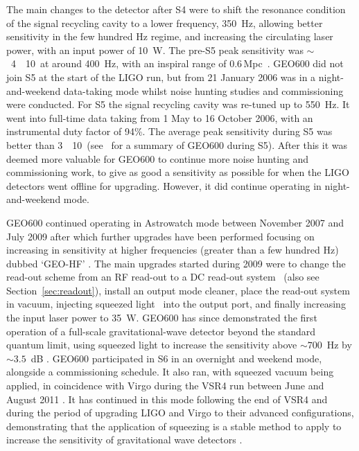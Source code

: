 The main changes to the detector after S4 were to shift the resonance condition of the signal recycling 
cavity to a lower frequency, 350~Hz, allowing better sensitivity in the few hundred Hz regime, and increasing 
the circulating laser power, with an input power of 10~W. The pre-S5 peak sensitivity was
$\sim$~4~\texttimes~10~\Hz at around 400~Hz, with an inspiral range of 0.6\,Mpc~\cite{Hild:2006b}. 
GEO600 did not join S5 at the start of the LIGO run, but from 21 January 2006 was in a night-and-weekend 
data-taking mode whilst noise hunting studies and commissioning were conducted. For S5 the signal recycling 
cavity was re-tuned up to 550~Hz. It went into full-time data taking from 1 May to 16 October 2006, with an 
instrumental duty factor of 94\%. The average peak sensitivity during S5 was better than
3~\texttimes~10~\Hz (see~\cite{Willke:2007} for a summary of GEO600 during S5). After this it was 
deemed more valuable for GEO600 to continue more noise hunting and commissioning work, to give as good a 
sensitivity as possible for when the LIGO detectors went offline for upgrading. However, it did continue 
operating in night-and-weekend mode.

GEO600 continued operating in Astrowatch mode between November 2007 and July 2009 after which further 
upgrades have been performed focusing on increasing in sensitivity at higher frequencies (greater than a
few hundred Hz) dubbed `GEO-HF' \cite{Willke:2006, Grote:2010}.  The main upgrades started during 2009 were 
to change the read-out scheme from an RF read-out to a DC read-out system~\cite{Hild:2009} (also see 
Section~\ref{sec:readout}), install an output mode cleaner, place the read-out system in vacuum, injecting 
squeezed light~\cite{Vahlbruch:2008, Chelkowski:2007} into the output port, and finally increasing the input 
laser power to 35~W. GEO600 has since demonstrated the first operation of a full-scale gravitational-wave 
detector beyond the standard quantum limit, using squeezed light to increase the sensitivity above $\sim 
700$~Hz by $\sim 3.5$~dB \cite{2011NatPh...7..962L}. GEO600 participated in S6 in an overnight and weekend 
mode, alongside a commissioning schedule. It also ran, with squeezed vacuum being applied, in coincidence 
with Virgo during the VSR4 run between June and August 2011 \cite{2013PhRvL.110r1101G}. It has continued in 
this mode following the end of VSR4 and during the period of upgrading LIGO and Virgo to their advanced 
configurations, demonstrating that the application of squeezing is a stable method to apply to increase the 
sensitivity of gravitational wave detectors \cite{2013PhRvL.110r1101G}.


